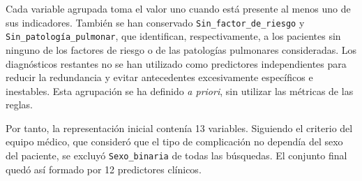 Cada variable agrupada toma el valor uno cuando está presente al menos uno de sus indicadores. También se han conservado \texttt{Sin\_factor\_de\_riesgo} y \texttt{Sin\_patología\_pulmonar}, que identifican, respectivamente, a los pacientes sin ninguno de los factores de riesgo o de las patologías pulmonares consideradas. Los diagnósticos restantes no se han utilizado como predictores independientes para reducir la redundancia y evitar antecedentes excesivamente específicos e inestables. Esta agrupación se ha definido \textit{a priori}, sin utilizar las métricas de las reglas.


Por tanto, la representación inicial contenía 13 variables. Siguiendo el criterio del equipo médico, que consideró que el tipo de complicación no dependía del sexo del paciente, se excluyó  \texttt{Sexo\_binaria} de todas las búsquedas. El conjunto final quedó así formado por 12 predictores clínicos.



